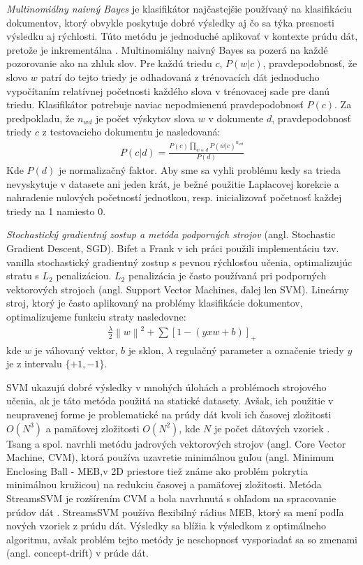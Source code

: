 \textit{Multinomiálny naivný Bayes} je klasifikátor najčastejšie používaný na klasifikáciu dokumentov, ktorý obvykle poskytuje dobré výsledky aj čo sa týka presnosti výsledku aj rýchlosti. Túto metódu je jednoduché aplikovať v kontexte prúdu dát, pretože je inkrementálna \citep{bifet2010sentiment}. Multinomiálny naivný Bayes sa pozerá na každé pozorovanie ako na zhluk slov. Pre každú triedu $c$, $P(w|c)$, pravdepodobnosť, že slovo $w$ patrí do tejto triedy je odhadovaná z trénovacích dát jednoducho vypočítaním relatívnej početnosti každého slova v trénovacej sade pre danú triedu. Klasifikátor potrebuje naviac nepodmienenú pravdepodobnosť $P(c)$. Za predpokladu, že $\displaystyle n_{wd}$ je počet výskytov slova $w$ v dokumente $d$, pravdepodobnosť triedy $c$ z testovacieho dokumentu je nasledovaná: \newline
\begin{align*}
P(c|d) = \frac{P(c)\prod _{w \in d} P(w|c)^{n_{wd}}} {P(d)}
\end{align*}
Kde $P(d)$ je normalizačný faktor. Aby sme sa vyhli problému kedy sa trieda nevyskytuje v datasete ani jeden krát, je bežné použitie Laplacovej korekcie a nahradenie nulových početností jednotkou, resp. inicializovať početnosť každej triedy na 1 namiesto 0.


\textit{Stochastický gradientný zostup a metóda podporných strojov} (angl. Stochastic Gradient Descent, SGD). Bifet a Frank v ich práci použili implementáciu tzv. vanilla stochastický gradientný zostup s pevnou rýchlosťou učenia, optimalizujúc stratu s $L_2$ penalizáciou. $L_2$ penalizácia je často používaná pri podporných vektorových strojoch (angl. Support Vector Machines, ďalej len SVM). Lineárny stroj, ktorý je často aplikovaný na problémy klasifikácie dokumentov, optimalizujeme funkciu straty nasledovne:
\begin{align*}
\frac{\lambda }{2}\left \| w \right \|^{2}+\sum [1-(yxw + b)]_{+}
\end{align*}
kde $w$ je váhovaný vektor, $b$ je sklon, $\lambda$ regulačný parameter a označenie triedy $y$ je z intervalu $\{+1, -1\}$.
\par
SVM ukazujú dobré výsledky v mnohých úlohách a problémoch strojového učenia, ak je táto metóda použitá na statické datasety. Avšak, ich použitie v neupravenej forme je problematické na prúdy dát kvoli ich časovej zložitosti $O(N^3)$ a pamäťovej zložitosti $O(N^2)$, kde $N$ je počet dátových vzoriek \citep{nguyen2015survey}. Tsang a spol. navrhli metódu jadrových vektorových strojov (angl. Core Vector Machine, CVM), ktorá používa uzavretie minimálnou guľou (angl. Minimum Enclosing Ball - MEB,v 2D priestore tiež známe ako problém pokrytia minimálnou kružicou) na redukciu časovej a pamäťovej zložitosti. Metóda StreamsSVM je rozšírením CVM a bola navrhnutá s ohľadom na spracovanie prúdov dát \citep{rai2009streamed}. StreamsSVM používa flexibilný rádius MEB, ktorý sa mení podľa nových vzoriek z prúdu dát. Výsledky sa blížia k výsledkom z optimálneho algoritmu, avšak problém tejto metódy je neschopnosť vysporiadať sa so zmenami (angl. concept-drift) v prúde dát.


